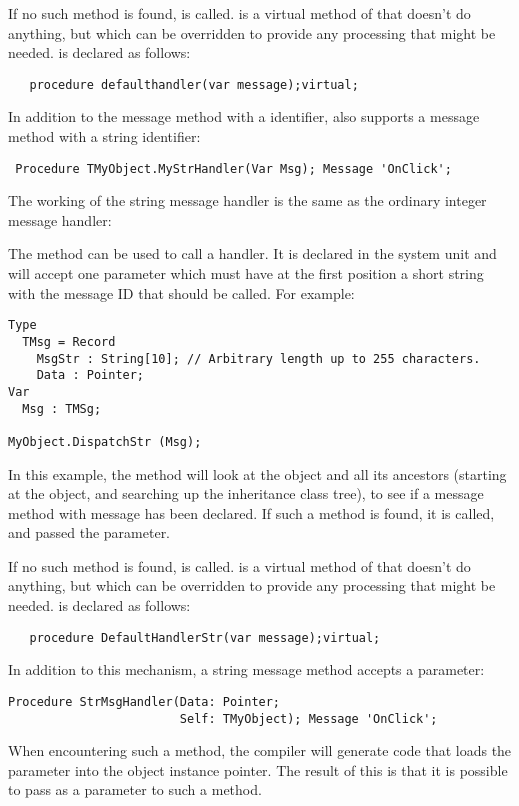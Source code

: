 If no such method is found,  is called.
 is a virtual method of  that doesn't do
anything, but which can be overridden to provide any processing that might be
needed.  is declared as follows:
\begin{verbatim}
   procedure defaulthandler(var message);virtual;
\end{verbatim}

In addition to the message method with a  identifier,
\fpc also supports a message method with a string identifier:
\begin{verbatim}
 Procedure TMyObject.MyStrHandler(Var Msg); Message 'OnClick';
\end{verbatim}
The working of the string message handler is the same as the ordinary
integer message handler:

The   method can be used to call a 
handler. It is declared in the system unit and will accept one parameter
which must have at the first position a short string with the message ID that
should be called. For example:
\begin{verbatim}
Type
  TMsg = Record
    MsgStr : String[10]; // Arbitrary length up to 255 characters.
    Data : Pointer;
Var
  Msg : TMSg;

MyObject.DispatchStr (Msg);
\end{verbatim}
In this example, the  method will look at the object and
all its ancestors (starting at the object, and searching up the inheritance 
class tree), to see if a message method with message  has been
declared. If such a method is found, it is called, and passed the
 parameter.

If no such method is found,  is called.
 is a virtual method of  that doesn't do
anything, but which can be overridden to provide any processing that might be
needed.  is declared as follows:
\begin{verbatim}
   procedure DefaultHandlerStr(var message);virtual;
\end{verbatim}
In addition to this mechanism, a string message method accepts a 
parameter:
\begin{verbatim}
Procedure StrMsgHandler(Data: Pointer; 
                        Self: TMyObject); Message 'OnClick';
\end{verbatim}
When encountering such a method, the compiler will generate code that loads
the  parameter into the object instance pointer. The result of
this is that it is possible to pass  as a parameter to such a
method.

